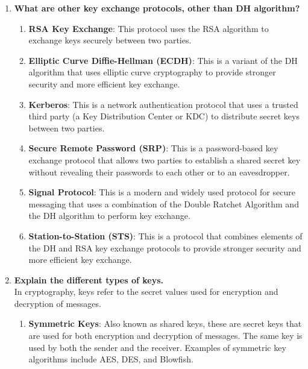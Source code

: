 \documentclass[openany]{book}
\begin{document}
\begin{enumerate}
    \item \textbf{What are other key exchange protocols, other than DH algorithm?}

          \begin{enumerate}
              \item \textbf{RSA Key Exchange}: This protocol uses the RSA algorithm to exchange keys securely between two parties.
              \item \textbf{Elliptic Curve Diffie-Hellman (ECDH)}: This is a variant of the DH algorithm that uses elliptic curve cryptography to provide stronger security and more efficient key exchange.
              \item \textbf{Kerberos}: This is a network authentication protocol that uses a trusted third party (a Key Distribution Center or KDC) to distribute secret keys between two parties.
              \item \textbf{Secure Remote Password (SRP)}: This is a password-based key exchange protocol that allows two parties to establish a shared secret key without revealing their passwords to each other or to an eavesdropper.
              \item \textbf{Signal Protocol}: This is a modern and widely used protocol for secure messaging that uses a combination of the Double Ratchet Algorithm and the DH algorithm to perform key exchange.
              \item \textbf{Station-to-Station (STS)}: This is a protocol that combines elements of the DH and RSA key exchange protocols to provide stronger security and more efficient key exchange.
          \end{enumerate}

    \item \textbf{Explain the different types of keys.}\\

          In cryptography, keys refer to the secret values used for encryption and decryption of messages.

          \begin{enumerate}

              \item \textbf{Symmetric Keys}: Also known as shared keys, these are secret keys that are used for both encryption and decryption of messages. The same key is used by both the sender and the receiver. Examples of symmetric key algorithms include AES, DES, and Blowfish.


\end{enumerate}
\end{enumerate}
\end{document}
